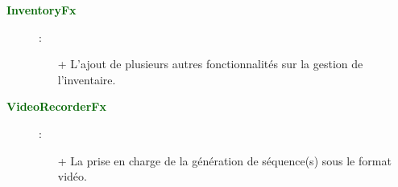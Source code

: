 \documentclass[a4paper, 11pt]{article}
\begin{document}
	\newpage \begin{description}
		\item [\textcolor{darkgreen}{\textbf{InventoryFx}}]:
		\begin{itemize}
			\item[+] L'ajout de plusieurs autres fonctionnalités sur la gestion de l'inventaire.\\
		\end{itemize}
	\end{description}
	\begin{description}
		\item [\textcolor{darkgreen}{\textbf{VideoRecorderFx}}]:
		\begin{itemize}
			\item[+] La prise en charge de la génération de séquence(s) sous le format vidéo.\\
		\end{itemize}
	\end{description}
\end{document}
